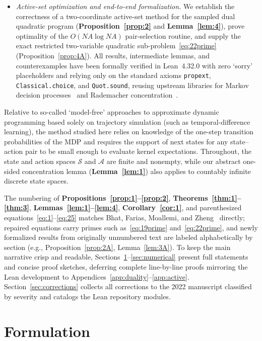 \documentclass[11pt,letterpaper]{article}
\theoremstyle{definition}
\begin{document}
\begin{itemize}[leftmargin=2em,itemsep=3pt]
  \item \emph{Active-set optimization and end-to-end formalization.} We establish the correctness of a two-coordinate active-set method for the sampled dual quadratic program (\textbf{Proposition~\ref{prop:2}} and \textbf{Lemma~\ref{lem:4}}), prove optimality of the $O(NA\log NA)$ pair-selection routine, and supply the exact restricted two-variable quadratic sub-problem~\eqref{eq:22prime} (Proposition~\ref{prop:4A}). All results, intermediate lemmas, and counterexamples have been formally verified in Lean~4.32.0 with zero `sorry' placeholders and relying only on the standard axioms \nolinkurl{propext}, \nolinkurl{Classical.choice}, and \nolinkurl{Quot.sound}, reusing upstream libraries for Markov decision processes~\cite{LeanEconomics} and Rademacher concentration~\cite{FoML}.
\end{itemize}

Relative to so-called `model-free' approaches to approximate dynamic programming based solely on trajectory simulation (such as temporal-difference learning), the method studied here relies on knowledge of the one-step transition probabilities of the MDP and requires the support of next states for any state--action pair to be small enough to evaluate kernel expectations. Throughout, the state and action spaces $\mathcal{S}$ and $\mathcal{A}$ are finite and nonempty, while our abstract one-sided concentration lemma (\textbf{Lemma~\ref{lem:1}}) also applies to countably infinite discrete state spaces.

The numbering of \textbf{Propositions~\ref{prop:1}--\ref{prop:2}}, \textbf{Theorems~\ref{thm:1}--\ref{thm:3}}, \textbf{Lemmas~\ref{lem:1}--\ref{lem:4}}, \textbf{Corollary~\ref{cor:1}}, and parenthesized equations~\eqref{eq:1}--\eqref{eq:25} matches Bhat, Farias, Moallemi, and Zheng~\cite{BFMZ22} directly; repaired equations carry primes such as~\eqref{eq:19prime} and~\eqref{eq:22prime}, and newly formalized results from originally unnumbered text are labeled alphabetically by section (e.g., Proposition~\ref{prop:2A}, Lemma~\ref{lem:3A}). To keep the main narrative crisp and readable, Sections~\ref{sec:formulation}--\ref{sec:numerical} present full statements and concise proof sketches, deferring complete line-by-line proofs mirroring the Lean development to Appendices~\ref{app:duality}--\ref{app:active}. Section~\ref{sec:corrections} collects all corrections to the 2022 manuscript classified by severity and catalogs the Lean repository modules.

\section{Formulation}
\label{sec:formulation}
\end{document}
